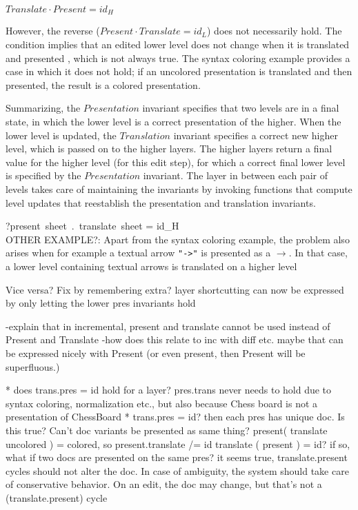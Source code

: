\begin{small}\begin{math}
Translate \cdot Present = id_{H}
\end{math}\end{small}


However, the reverse ($Present \cdot Translate = id_{L}$) does not necessarily hold. The condition implies that an edited lower level does not change when it is translated and presented , which is not always true. The syntax coloring example provides a case in which it does not hold; if an uncolored presentation is translated and then presented, the result is a colored presentation. 
\ec

Summarizing, the $Presentation$ invariant specifies that two levels are in a final state, in which the lower level is a correct presentation of the higher. When the lower level is updated, the $Translation$ invariant specifies a correct new higher level, which is passed on to the higher layers. The higher layers return a final value for the higher level (for this edit step), for which a correct final lower level is specified by the $Presentation$ invariant. The layer in between each pair of levels takes care of maintaining the invariants by invoking functions that compute level updates that reestablish the presentation and translation invariants.


\bc
?present~sheet~.~translate~sheet = id_{H}\\

OTHER EXAMPLE?: Apart from the syntax coloring example, the problem also arises when for example a textual arrow 
\verb|"->"| is presented as a $\rightarrow$. In that case, a lower level containing textual arrows is 
translated on a higher level 

Vice versa? Fix by remembering extra?
 layer shortcutting can now be expressed by only letting the lower pres invariants hold

 -explain that in incremental, present and translate cannot be used instead of Present and Translate
 -how does this relate to inc with diff etc. maybe that can be expressed nicely with Present
 (or even present, then Present will be superfluous.)

* does   trans.pres = id hold for a layer? pres.trans never needs to hold due to syntax coloring, normalization etc., but also because Chess board is not a presentation of ChessBoard   
* trans.pres = id? then each pres has unique doc. Is this true? Can't doc variants be presented as same thing?
   present( translate uncolored ) = colored, so present.translate /= id
   translate ( present ) = id? if so, what if two docs are presented on the same pres?
 it seems true, translate.present cycles should not alter the doc. In case of ambiguity, the system should
 take care of conservative behavior. On an edit, the doc may change, but that's not a (translate.present) cycle

